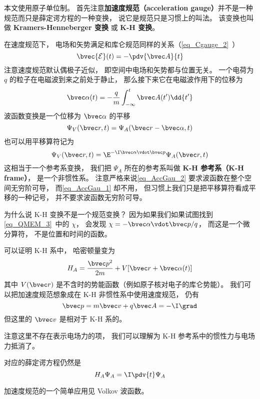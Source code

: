 

本文使用原子单位制。 首先注意\textbf{加速度规范（acceleration gauge）}并不是一种规范而只是薛定谔方程的一种变换， 说它是规范只是习惯上的叫法。 该变换也叫做 \textbf{Kramers-Henneberger 变换} 或 \textbf{K-H 变换}。

在速度规范下， 电场和矢势满足和库仑规范同样的关系（\autoref{eq_Cgauge_2}~）
\begin{equation}\label{eq_AccGau_5}
\bvec {\mathcal{E}}(t) = -\pdv{\bvec A}{t}
\end{equation}
注意速度规范默认偶极子近似， 即空间中电场和矢势都与位置无关。 一个电荷为 $q$ 的粒子在电磁波到来之前处于静止， 那么接下来它在电磁波作用下的位移为
\begin{equation}\label{eq_AccGau_3}
\bvec \alpha(t) = -\frac{q}{m}\int_{-\infty}^t \bvec A(t') \dd{t'}
\end{equation}
波函数变换是一个位移为 $\bvec \alpha$ 的平移
\begin{equation}\label{eq_AccGau_1}
\Psi_V(\bvec r, t) = \Psi_A(\bvec r - \bvec \alpha, t)
\end{equation}
也可以用平移算符记为
\begin{equation}\label{eq_AccGau_2}
\Psi_V(\bvec r, t) = \E^{-\I \bvec \alpha \vdot \bvec p} \Psi_A(\bvec r, t)
\end{equation}
这相当于一个参考系变换， 我们把 $\Psi_A$ 所在的参考系叫做 \textbf{K-H 参考系（K-H frame）}， 是一个非惯性系。 注意严格来说\autoref{eq_AccGau_2} 要求波函数在整个空间无穷阶可导， 而\autoref{eq_AccGau_1} 却不用， 但习惯上我们只是把平移算符看成平移的一种记号， 并不要求波函数无穷阶可导。

为什么说 K-H 变换不是一个规范变换？ 因为如果我们如果试图找到\autoref{eq_QMEM_3}~中的 $\chi$， 会发现 $\chi = -\bvec \alpha \vdot \bvec p/q$， 而这是一个微分算符， 不是位置和时间的函数。

可以证明 K-H 系中， 哈密顿量变为
\begin{equation}
H_A = \frac{\bvec p^2}{2m} + V[\bvec r + \bvec \alpha(t)]
\end{equation}
其中 $V(\bvec r)$ 是不含时的势能函数（例如原子核对电子的库仑势能）。 我们可以把加速度规范想象成在 K-H 非惯性系中使用速度规范， 仍有
\begin{equation}
\bvec p = m\bvec v + q\bvec A = -\I \grad
\end{equation}
但这里的 $\bvec v$ 是相对于 K-H 系的。

注意这里不存在表示电场力的项， 我们可以理解为 K-H 参考系中的惯性力与电场力抵消了。

对应的薛定谔方程仍然是
\begin{equation}\label{eq_AccGau_4}
H_A \Psi_A = \I \pdv{t} \Psi_A
\end{equation}

加速度规范的一个简单应用见 Volkov 波函数。
